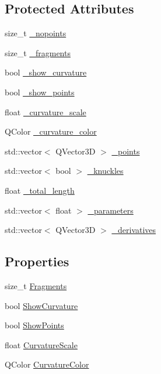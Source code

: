 \subsection*{Protected Attributes}
\begin{DoxyCompactItemize}
\item 
size\-\_\-t \hyperlink{classShipCAD_1_1Spline_a94ae8704ab2cae5ba6bb915e3df2e98d}{\-\_\-nopoints}
\item 
size\-\_\-t \hyperlink{classShipCAD_1_1Spline_ac12e47ffb75b6d84877f849d18323622}{\-\_\-fragments}
\item 
bool \hyperlink{classShipCAD_1_1Spline_a5b5ebff933cd6fc2d59e0412bf342591}{\-\_\-show\-\_\-curvature}
\item 
bool \hyperlink{classShipCAD_1_1Spline_af850b71f44eaced42ede035d73cb4271}{\-\_\-show\-\_\-points}
\item 
float \hyperlink{classShipCAD_1_1Spline_ac9b097c34a061077a02fc9e1563b3e86}{\-\_\-curvature\-\_\-scale}
\item 
Q\-Color \hyperlink{classShipCAD_1_1Spline_add77b6dfe1a27c34602b3d2f576be7f4}{\-\_\-curvature\-\_\-color}
\item 
std\-::vector$<$ Q\-Vector3\-D $>$ \hyperlink{classShipCAD_1_1Spline_a6288af72f907a160974b7ce5207316ec}{\-\_\-points}
\item 
std\-::vector$<$ bool $>$ \hyperlink{classShipCAD_1_1Spline_ac7d024ce90642d78587bc921efde009c}{\-\_\-knuckles}
\item 
float \hyperlink{classShipCAD_1_1Spline_ae9e5a60e0a8722d9a3cd483f6019e4e9}{\-\_\-total\-\_\-length}
\item 
std\-::vector$<$ float $>$ \hyperlink{classShipCAD_1_1Spline_a374180992c17d3ee4b869d45080529fc}{\-\_\-parameters}
\item 
std\-::vector$<$ Q\-Vector3\-D $>$ \hyperlink{classShipCAD_1_1Spline_a8478f85abd680e3caee34dc230eed3e7}{\-\_\-derivatives}
\end{DoxyCompactItemize}
\subsection*{Properties}
\begin{DoxyCompactItemize}
\item 
size\-\_\-t \hyperlink{classShipCAD_1_1Spline_a5e4df2a54955094c035f32a442602afc}{Fragments}
\item 
bool \hyperlink{classShipCAD_1_1Spline_a9572e31014a04689a2987475c9bff080}{Show\-Curvature}
\item 
bool \hyperlink{classShipCAD_1_1Spline_abac1aad3fc0e33ea8ccda1a94bea8467}{Show\-Points}
\item 
float \hyperlink{classShipCAD_1_1Spline_a5e8a93a4b5d164f38773e7edbf7753b3}{Curvature\-Scale}
\item 
Q\-Color \hyperlink{classShipCAD_1_1Spline_ac5268eaa6aadac5db072c7fdeb578ed4}{Curvature\-Color}
\end{DoxyCompactItemize}


